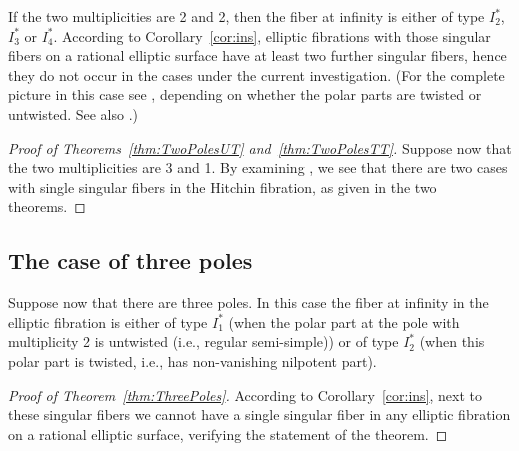 \documentclass[pdftex]{sigma}
\numberwithin{equation}{section}
\begin{document}
If the two multiplicities are 2 and 2, then the fiber at infinity is
either of type $I_2^*$, $I_3^*$ or $I_4^*$. According to
Corollary~\ref{cor:ins}, elliptic fibrations with those singular fibers
on a rational elliptic surface have at least two further singular fibers,
hence they do not occur in the cases under the current investigation.
(For the complete picture in this case see
\cite[Theorems~{2.1,~2.2,~2.3}]{ISS2}, depending on whether the polar
parts are twisted or untwisted. See also \cite[Table~1]{ISS2}.)

\begin{proof}[Proof of Theorems~\ref{thm:TwoPolesUT} and~\ref{thm:TwoPolesTT}]
Suppose now that the two mul\-ti\-pli\-ci\-ties are 3 and 1. By
examining \cite[Theorems~{2.4,~2.5,~2.6,~2.7}]{ISS2}, we see that there
are two cases with single singular fibers in the Hitchin fibration,
as given in the two theorems.
\end{proof}


\subsection{The case of three poles}
Suppose now that there are three poles. In this case the fiber at
infinity in the elliptic fibration is either of type $I_1^*$ (when the
polar part at the pole with multiplicity 2 is untwisted (i.e., regular
semi-simple)) or of type $I_2^*$ (when this polar part is twisted, i.e., has non-vanishing nilpotent part).

\begin{proof}[Proof of Theorem~\ref{thm:ThreePoles}]
According to Corollary~\ref{cor:ins}, next to these singular fibers
we cannot have a single singular fiber in any elliptic fibration on a
rational elliptic surface, verifying the statement of the theorem.
\end{proof}
\end{document}
